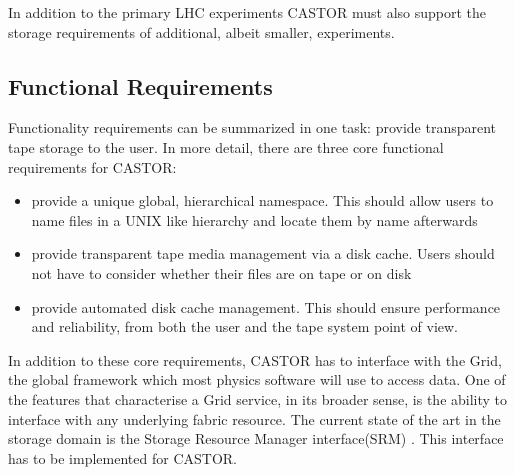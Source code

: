 In addition to the primary LHC experiments CASTOR must also support
the storage requirements of additional, albeit smaller, experiments.

\subsection{Functional Requirements}

Functionality requirements can be summarized in one task: provide
transparent tape storage to the user. In more detail, there are three
core functional requirements for CASTOR:

\begin{itemize}  
\item provide a unique global, hierarchical namespace. This should allow
users to name files in a UNIX like hierarchy and locate them by name afterwards
\item provide transparent tape media management via a disk cache.
Users should not have to consider whether their files are on tape or on
disk
\item provide automated disk cache management. This should ensure
performance and reliability, from both the user and the tape system
point of view.
\end{itemize}

In addition to these core requirements, CASTOR has to interface with
the Grid, the global framework which most physics software
will use to access data. One of the features that characterise a Grid
service, in its broader sense, is the ability to interface with any
underlying fabric resource. The current state of the art in the storage
domain is the Storage Resource Manager interface(SRM) \cite{SRM}.
This interface has to be implemented for CASTOR.

